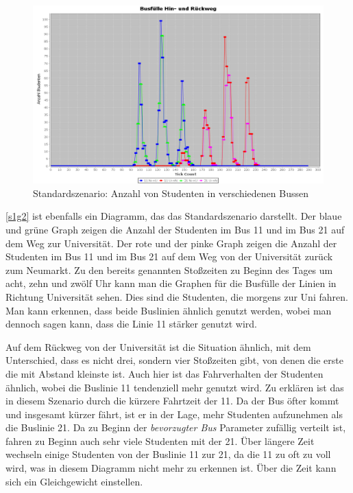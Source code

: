 \documentclass[12pt,a4paper]{scrartcl}
\begin{document}
\begin{figure}
\includegraphics[scale=0.4]{Standardszenario_Busse.png}
\caption{Standardszenario: Anzahl von Studenten in verschiedenen Bussen}
\label{s1g2}
\end{figure}

\autoref{s1g2} ist ebenfalls ein Diagramm, das das Standardszenario darstellt. Der blaue und grüne Graph zeigen die Anzahl der Studenten im Bus 11 und im Bus 21 auf dem Weg zur Universität. Der rote und der pinke Graph zeigen die Anzahl der Studenten im Bus 11 und im Bus 21 auf dem Weg von der Universität zurück zum Neumarkt. Zu den bereits genannten Stoßzeiten zu Beginn des Tages um acht, zehn und zwölf Uhr kann man die Graphen für die Busfülle der Linien in Richtung Universität sehen. Dies sind die Studenten, die morgens zur Uni fahren. Man kann erkennen, dass beide Buslinien ähnlich genutzt werden, wobei man dennoch sagen kann, dass die Linie 11 stärker genutzt wird. 

Auf dem Rückweg von der Universität ist die Situation ähnlich, mit dem Unterschied, dass es nicht drei, sondern vier Stoßzeiten gibt, von denen die erste die mit Abstand kleinste ist. Auch hier ist das Fahrverhalten der Studenten ähnlich, wobei die Buslinie 11 tendenziell mehr genutzt wird. 
Zu erklären ist das in diesem Szenario durch die kürzere Fahrtzeit der 11. Da der Bus öfter kommt und insgesamt kürzer fährt, ist er in der Lage, mehr Studenten aufzunehmen als die Buslinie 21. Da zu Beginn der \textit{bevorzugter Bus} Parameter zufällig verteilt ist, fahren zu Beginn auch sehr viele Studenten mit der 21. Über längere Zeit wechseln einige Studenten von der Buslinie 11 zur 21, da die 11 zu oft zu voll wird, was in diesem Diagramm nicht mehr zu erkennen ist. Über die Zeit kann sich ein Gleichgewicht einstellen.
\end{document}

